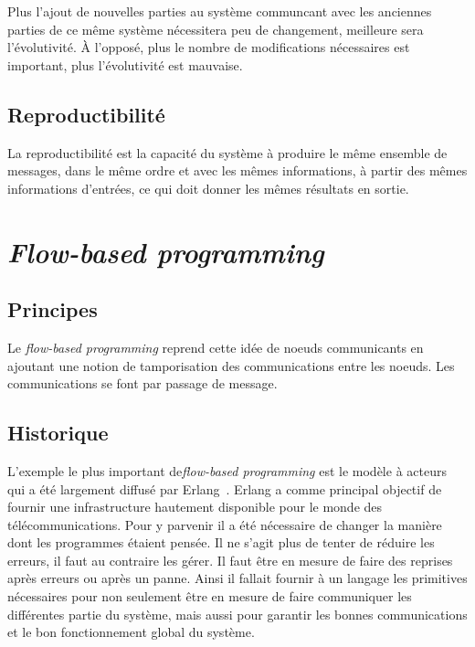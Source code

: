 \documentclass{article}
\begin{document}
Plus l'ajout de nouvelles parties au système communcant avec les anciennes parties
de ce même système nécessitera peu de changement, meilleure sera l'évolutivité.
À l'opposé, plus le nombre de modifications nécessaires est important, plus l'évolutivité
est mauvaise.

\subsection{Reproductibilité}
La reproductibilité est la capacité du système à produire le même ensemble de messages,
dans le même ordre et avec les mêmes informations, à partir des mêmes informations d'entrées,
ce qui doit donner les mêmes résultats en sortie.


\section{\emph{Flow-based programming}}\label{flow-based}

\subsection{Principes}\label{principes}

Le \emph{flow-based programming} reprend cette idée de noeuds
communicants en ajoutant une notion de tamporisation des communications
entre les noeuds. Les communications se font par passage de message.

\subsection{Historique}\label{historique}
L'exemple le plus important de\emph{flow-based programming} est le modèle à acteurs~\cite{actors}
qui a été largement diffusé par Erlang~\cite{erlang}.
Erlang a comme principal objectif de fournir une infrastructure hautement disponible
pour le monde des télécommunications.
Pour y parvenir il a été nécessaire de changer la manière dont les programmes étaient pensée.
Il ne s'agit plus de tenter de réduire les erreurs, il faut au contraire les gérer.
Il faut être en mesure de faire des reprises après erreurs ou après un panne.
Ainsi il fallait fournir à un langage les primitives nécessaires pour non seulement
être en mesure de faire communiquer les différentes partie du système, mais aussi
pour garantir les bonnes communications et le bon fonctionnement global du système.
\end{document}
